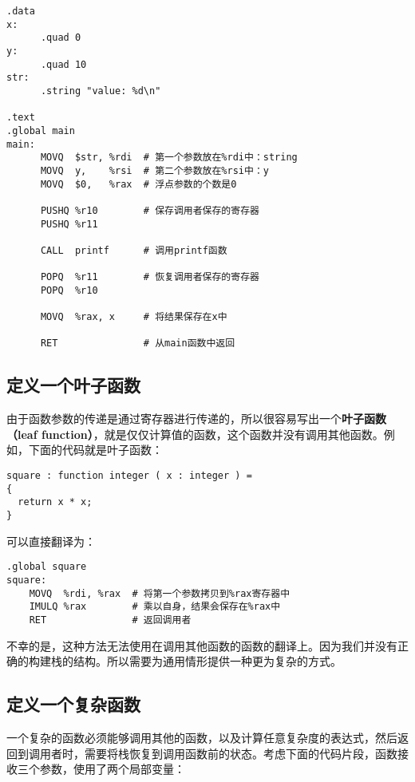 \documentclass[cn,11pt,chinese]{elegantbook}
\begin{document}
\begin{verbatim}
.data
x:
      .quad 0
y:
      .quad 10
str:
      .string "value: %d\n"
      
.text
.global main
main:
      MOVQ  $str, %rdi  # 第一个参数放在%rdi中：string
      MOVQ  y,    %rsi  # 第二个参数放在%rsi中：y
      MOVQ  $0,   %rax  # 浮点参数的个数是0
      
      PUSHQ %r10        # 保存调用者保存的寄存器
      PUSHQ %r11
      
      CALL  printf      # 调用printf函数
      
      POPQ  %r11        # 恢复调用者保存的寄存器
      POPQ  %r10
      
      MOVQ  %rax, x     # 将结果保存在x中
      
      RET               # 从main函数中返回
\end{verbatim}

\subsection{定义一个叶子函数}

由于函数参数的传递是通过寄存器进行传递的，所以很容易写出一个\textbf{叶子函数（leaf function）}，就是仅仅计算值的函数，这个函数并没有调用其他函数。例如，下面的代码就是叶子函数：

\begin{verbatim}
square : function integer ( x : integer ) =
{
  return x * x;
}
\end{verbatim}

可以直接翻译为：

\begin{verbatim}
.global square
square:
    MOVQ  %rdi, %rax  # 将第一个参数拷贝到%rax寄存器中
    IMULQ %rax        # 乘以自身，结果会保存在%rax中
    RET               # 返回调用者
\end{verbatim}

不幸的是，这种方法无法使用在调用其他函数的函数的翻译上。因为我们并没有正确的构建栈的结构。所以需要为通用情形提供一种更为复杂的方式。

\subsection{定义一个复杂函数}

一个复杂的函数必须能够调用其他的函数，以及计算任意复杂度的表达式，然后返回到调用者时，需要将栈恢复到调用函数前的状态。考虑下面的代码片段，函数接收三个参数，使用了两个局部变量：
\end{document}
